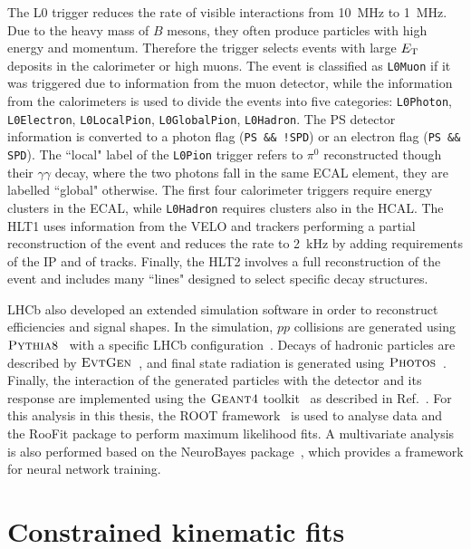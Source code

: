 The L0 trigger reduces the rate of visible interactions from 10~MHz to 1~MHz.
Due to the heavy mass of $B$ mesons, they often produce particles with high energy and momentum.
Therefore the trigger selects events with large $E_{\rm T}$ deposits in the calorimeter
or high \pt muons. The event is classified as \verb!L0Muon! if it was triggered due to information
from the muon detector, while the information from the calorimeters is used to divide the
events into five categories: \verb!L0Photon!, \verb!L0Electron!, \verb!L0LocalPion!, 
\verb!L0GlobalPion!, \verb!L0Hadron!. The PS detector information is converted to a photon flag 
(\verb|PS && !SPD|) or an electron flag (\verb|PS && SPD|). The ``local" label of the \verb!L0Pion! trigger 
refers to $\pi^0$ reconstructed though their $\gamma\gamma$ decay, where the two photons fall in the 
same ECAL element, they are labelled ``global" otherwise. The first four calorimeter triggers require 
energy clusters in the ECAL, while \verb!L0Hadron! requires clusters also in the HCAL. 
The HLT1 uses information from the VELO and trackers performing a partial reconstruction 
of the event and reduces the rate to 2~kHz by adding requirements of the IP and \chisq of tracks.
Finally, the HLT2 involves a full reconstruction of the event and includes many ``lines" designed 
to select specific decay structures.

LHCb also developed an extended simulation software in order to reconstruct efficiencies and signal shapes.
In the simulation, $pp$ collisions are generated using $\textsc{Pythia}8$~\cite{Sjostrand:2006za,Sjostrand:2007gs} with a specific
LHCb configuration~\cite{LHCb-PROC-2010-056}. Decays of hadronic particles are described by $\textsc{EvtGen}$~\cite{Lange:2001uf},
and final state radiation is generated using $\textsc{Photos}$~\cite{Golonka:2005pn}. Finally, the interaction of the generated
particles with the detector and its response are implemented using the $\textsc{Geant4}$ toolkit~\cite{Allison:2006ve}
as described in Ref.~\cite{LHCb-PROC-2011-006}. For this analysis in this thesis, the ROOT framework~\cite{Brun:2000es} is
used to analyse data and the RooFit package to perform maximum likelihood fits. A multivariate analysis is also performed
based on the NeuroBayes package~\cite{Feindt:2006pm,feindt-2004}, which provides a framework for neural network training.

\section{Constrained kinematic fits}
\label{sec:DTF}

